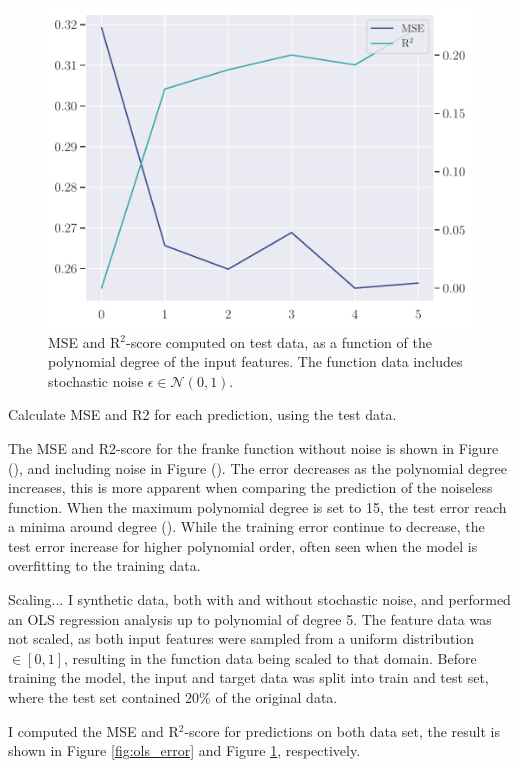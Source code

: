 \begin{figure}
    \centering
    \includegraphics[width=0.8\linewidth]{project-1/latex/figures/ols_error_noisy.pdf}
    \caption{MSE and R$^{2}$-score computed on test data, as a function of the polynomial degree of the input features. The function data includes stochastic noise $\epsilon \in \mathcal{N}(0, 1)$.}
    \label{fig:ols_error_noisy}
\end{figure}

Calculate MSE and R2 for each prediction, using the test data.

The MSE and R2-score for the franke function without noise is shown in Figure (), and including noise in Figure (). The error decreases as the polynomial degree increases, this is more apparent when comparing the prediction of the noiseless function. When the maximum polynomial degree is set to 15, the test error reach a minima around degree (). While the training error continue to decrease, the test error increase for higher polynomial order, often seen when the model is overfitting to the training data.


Scaling... 
I synthetic data, both with and without stochastic noise, and performed an OLS regression analysis up to polynomial of degree 5. The feature data was not scaled, as both input features were sampled from a uniform distribution $\in [0, 1]$, resulting in the function data being scaled to that domain. Before training the model, the input and target data was split into train and test set, where the test set contained $20\%$ of the original data.

I computed the MSE and R$^{2}$-score for predictions on both data set, the result is shown in Figure \ref{fig:ols_error} and Figure \ref{fig:ols_error_noisy}, respectively.

